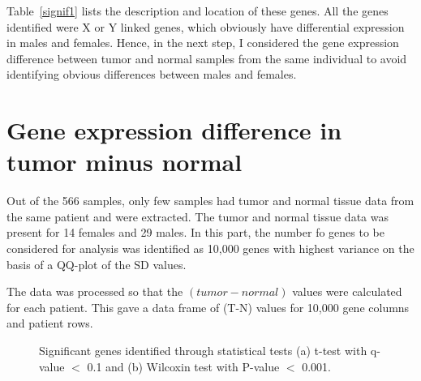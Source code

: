 \documentclass[11pt]{article} %
\begin{document}
Table~\ref{signif1} lists the description and location of these genes. All the genes identified were X or Y linked genes, which obviously have differential expression in males and females. Hence, in the next step, I considered the gene expression difference between tumor and normal samples from the same individual to avoid identifying obvious differences between males and females.

\section{Gene expression difference in tumor minus normal}

Out of the 566 samples, only few samples had tumor and normal tissue data from the same patient and were extracted. The tumor and normal tissue data was present for 14 females and 29 males. In this part, the number fo genes to be considered for analysis was identified as 10,000 genes with highest variance on the basis of a QQ-plot of the SD values.

The data was processed so that the $(tumor - normal)$ values were calculated for each patient. This gave a data frame of (T-N) values for 10,000 gene columns and patient rows. 

\begin{figure}[htbp]
\centering
{}
\caption{Significant genes identified through statistical tests (a) t-test with q-value $<$ 0.1 and (b) Wilcoxin test with P-value $<$ 0.001.}
\label{signif-test}
\end{figure}
\end{document}
